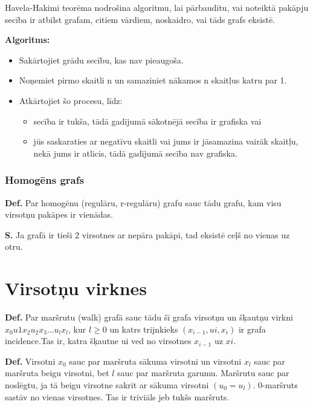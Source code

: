\documentclass{article}
\begin{document}
Havela-Hakimi teorēma nodrošina algoritmu, lai pārbaudītu, vai noteiktā pakāpju secība ir atbilst grafam, citiem vārdiem, noskaidro, vai tāds grafs eksistē. 

\textbf{Algoritms:}
\begin{itemize}
	\item Sakārtojiet grādu secību, kas nav pieaugoša.  \item Noņemiet pirmo skaitli n un samaziniet nākamos n skaitļus katru par 1.
	\item Atkārtojiet šo procesu, līdz:
	\begin{itemize}
		\item secība ir tukša, tādā gadījumā sākotnējā secība ir grafiska vai
		\item jūs saskaraties ar negatīvu skaitli vai jums ir jāsamazina vairāk skaitļu, nekā jums ir atlicis, tādā gadījumā secība nav grafiska.
	\end{itemize}
\end{itemize}

\subsubsection{Homogēns grafs}


\textbf{Def.} Par homogēnu (regulāru, r-regulāru) grafu sauc tādu grafu, kam visu virsotņu pakāpes ir vienādas.

\textbf{S. } Ja grafā ir tieši 2 virsotnes ar nepāra pakāpi, tad eksistē ceļš no vienas uz
otru.



\section{Virsotņu virknes}

\textbf{Def.}  Par maršrutu (walk) grafā sauc tādu šī grafa virsotņu un šķautņu virkni $x_0 u1 x_2 u_2 x_3 ...u_l x_l $, kur $l \ge 0$ un katrs trijnkieks $(x_{i−1} , ui , x_i )$ ir grafa incidence.Tas ir, katra šķautne ui ved no virsotnes $x_{i −1}$ uz $xi $.

\textbf{Def.}  Virsotni $x_0$ sauc par maršruta sākuma virsotni un virsotni $x_l$ sauc par maršruta beigu virsotni, bet $l$ sauc par maršruta garumu.  Maršrutu sauc par noslēgtu, ja tā beigu virsotne sakrīt ar sākuma virsotni $(u_0 = u_l )$.  0-maršruts sastāv no vienas virsotnes. Tas ir triviāls jeb tukšs maršruts.
\end{document}
